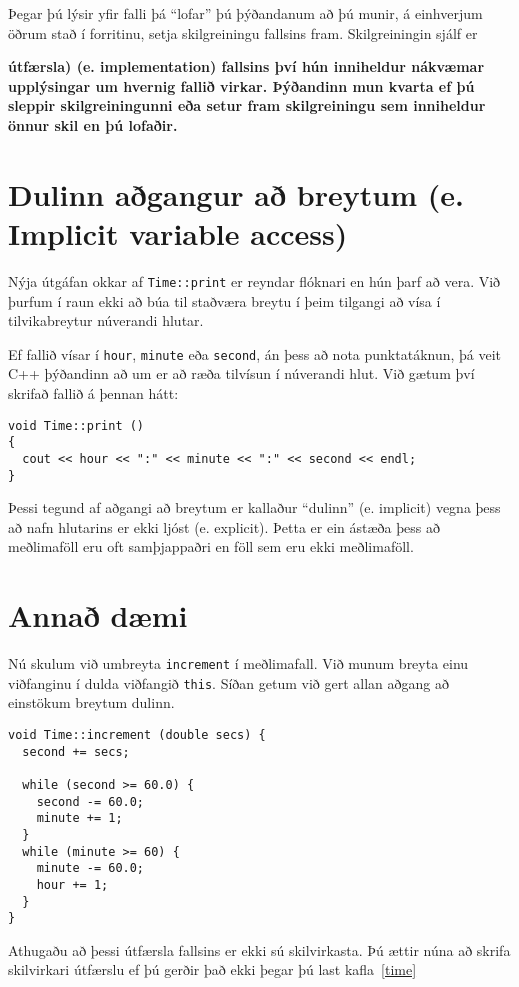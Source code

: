 Þegar þú lýsir yfir falli þá ``lofar'' þú þýðandanum að þú munir, á einhverjum öðrum stað í forritinu, setja skilgreiningu fallsins fram.
Skilgreiningin sjálf er {\bf útfærsla) (e. implementation) fallsins því hún inniheldur nákvæmar upplýsingar um hvernig fallið virkar.
Þýðandinn mun kvarta ef þú sleppir skilgreiningunni eða setur fram skilgreiningu sem inniheldur önnur skil en þú lofaðir.

\section {Dulinn aðgangur að breytum (e. Implicit variable access)}

Nýja útgáfan okkar af {\tt Time::print} er reyndar flóknari en hún þarf að vera.
Við þurfum í raun ekki að búa til staðværa breytu í þeim tilgangi að vísa í tilvikabreytur núverandi hlutar.

Ef fallið vísar í {\tt hour}, {\tt minute} eða {\tt second}, án þess að nota punktatáknun, þá veit C++ þýðandinn að um er að ræða tilvísun í núverandi hlut.
Við gætum því skrifað fallið á þennan hátt: 

\begin{verbatim}
void Time::print ()
{
  cout << hour << ":" << minute << ":" << second << endl;
}
\end{verbatim}
%
Þessi tegund af aðgangi að breytum er kallaður ``dulinn'' (e. implicit) vegna þess að nafn hlutarins er ekki ljóst (e. explicit). 
Þetta er ein ástæða þess að meðlimaföll eru oft samþjappaðri en föll sem eru ekki meðlimaföll.

\section {Annað dæmi}

Nú skulum við umbreyta {\tt increment} í meðlimafall.
Við munum breyta einu viðfanginu í dulda viðfangið {\tt this}.
Síðan getum við gert allan aðgang að einstökum breytum dulinn. 

\begin{verbatim}
void Time::increment (double secs) {
  second += secs;

  while (second >= 60.0) {
    second -= 60.0;
    minute += 1;
  }
  while (minute >= 60) {
    minute -= 60.0;
    hour += 1;
  }
}
\end{verbatim}
%
Athugaðu að þessi útfærsla fallsins er ekki sú skilvirkasta.
Þú ættir núna að skrifa skilvirkari útfærslu ef þú gerðir það ekki þegar þú last kafla~\ref{time}

}
